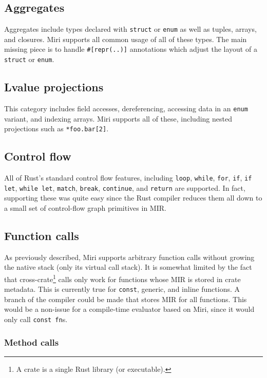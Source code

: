 \documentclass[twocolumn]{article}
\newcommand{\rust}[1]{\texttt{#1}}
\begin{document}
\subsection{Aggregates}

Aggregates include types declared with \rust{struct} or \rust{enum} as well as tuples, arrays, and
closures. Miri supports all common usage of all of these types. The main missing piece is to handle
\texttt{\#[repr(..)]} annotations which adjust the layout of a \rust{struct} or \rust{enum}.

\subsection{Lvalue projections}

This category includes field accesses, dereferencing, accessing data in an \rust{enum} variant, and
indexing arrays. Miri supports all of these, including nested projections such as
\rust{*foo.bar[2]}.

\subsection{Control flow}

All of Rust's standard control flow features, including \rust{loop}, \rust{while}, \rust{for},
\rust{if}, \rust{if let}, \rust{while let}, \rust{match}, \rust{break}, \rust{continue}, and
\rust{return} are supported. In fact, supporting these was quite easy since the Rust compiler
reduces them all down to a small set of control-flow graph primitives in MIR.

\subsection{Function calls}

As previously described, Miri supports arbitrary function calls without growing the native stack
(only its virtual call stack). It is somewhat limited by the fact that cross-crate\footnote{A crate
is a single Rust library (or executable).} calls only work for functions whose MIR is stored in
crate metadata. This is currently true for \rust{const}, generic, and inline functions.
A branch of the compiler could be made that stores MIR for all functions. This would be a non-issue
for a compile-time evaluator based on Miri, since it would only call \rust{const fn}s.

\subsubsection{Method calls}
\end{document}
